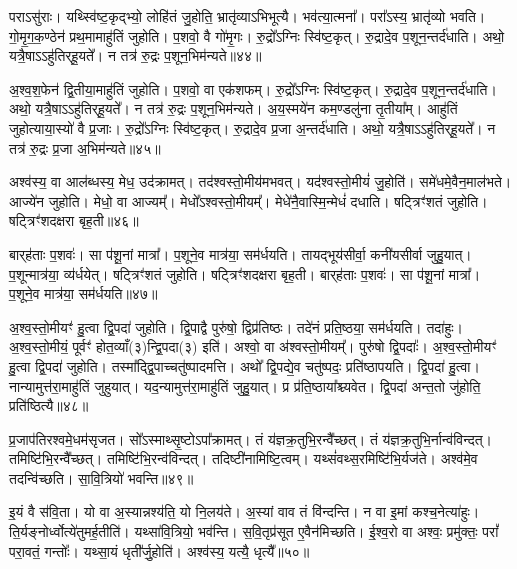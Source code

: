 पराऽसु॑राः।
यथ्स्वि॑ष्ट॒कृद्भ्यो॒ लोहि॑तं जु॒होति॒ भ्रातृ॑व्याऽभिभूत्यै।
भव॑त्या॒त्मना᳚।
परा᳚ऽस्य॒ भ्रातृ॑व्यो भवति।
गो॒मृ॒ग॒क॒ण्ठेन॑ प्रथ॒मामाहु॑तिं जुहोति।
प॒शवो॒ वै गो॑मृ॒गः।
रु॒द्रो᳚\-ऽग्निः स्वि॑ष्ट॒कृत्।
रु॒द्रादे॒व प॒शून॒न्तर्द॑धाति।
अथो॒ यत्रै॒षा\-ऽऽहु॑तिर्‌\mbox{}हू॒यते᳚।
न तत्र॑ रु॒द्रः प॒शून॒भिम॑न्यते॥४४॥\ip

अ॒श्व॒श॒फेन॑ द्वि॒तीया॒माहु॑तिं जुहोति।
प॒शवो॒ वा एक॑शफम्।
रु॒द्रो᳚\-ऽग्निः स्वि॑ष्ट॒कृत्।
रु॒द्रादे॒व प॒शून॒न्तर्द॑धाति।
अथो॒ यत्रै॒षा\-ऽऽहु॑तिर्‌\mbox{}हू॒यते᳚।
न तत्र॑ रु॒द्रः प॒शून॒भिम॑न्यते।
अ॒य॒स्मये॑न कम॒ण्डलु॑ना तृ॒तीया᳚म्।
आहु॑तिं जुहोत्याया॒स्यो॑ वै प्र॒जाः।
रु॒द्रो᳚\-ऽग्निः स्वि॑ष्ट॒कृत्।
रु॒द्रादे॒व प्र॒जा अ॒न्तर्द॑धाति।
अथो॒ यत्रै॒षा\-ऽऽहु॑तिर्‌\mbox{}हू॒यते᳚।
न तत्र॑ रु॒द्रः प्र॒जा अ॒भिम॑न्यते॥४५॥\ip\anuvakamend[द॒धा॒त्यभ॑वन्मन्यते प्र॒जा अ॒न्तर्द॑धाति॒ द्वे च॑ ]

अश्व॑स्य॒ वा आल॑ब्धस्य॒ मेध॒ उद॑क्रामत्।
तद॑श्वस्तो॒मीय॑\-मभवत्।
यद॑श्वस्तो॒मीयं॑ जु॒होति॑।
समे॑धमे॒वैन॒माल॑भते।
आज्ये॑न जुहोति।
मेधो॒ वा आज्यम्᳚।
मेधो᳚\-ऽश्वस्तो॒मीयम्᳚।
मेधे॑नै॒वास्मि॒न्मेधं॑ दधाति।
षट्त्रिꣳ॑शतं जुहोति।
षट्त्रिꣳ॑शदक्षरा बृह॒ती॥४६॥\ip

बार्‌\mbox{}ह॑ताः प॒शवः॑।
सा प॑शू॒नां मात्रा᳚।
प॒शूने॒व मात्र॑या॒ सम॑र्धयति।
तायद्भूय॑सीर्वा॒ कनी॑यसीर्वा जुहु॒यात्।
प॒शून्मात्र॑या॒ व्य॑र्धयेत्।
षट्त्रिꣳ॑शतं जुहोति।
षट्त्रिꣳ॑शदक्षरा बृह॒ती।
बार्‌\mbox{}ह॑ताः प॒शवः॑।
सा प॑शू॒नां मात्रा᳚।
प॒शूने॒व मात्र॑या॒ सम॑र्धयति॥४७॥\ip

अ॒श्व॒स्तो॒मीयꣳ॑ हु॒त्वा द्वि॒पदा॑ जुहोति।
द्वि॒पाद्वै पुरु॑षो॒ द्विप्र॑तिष्ठः।
तदे॑नं प्रति॒ष्ठया॒ सम॑र्धयति।
तदा॑हुः।
अ॒श्व॒स्तो॒मीयं॒ पूर्वꣳ॑ होत॒व्याँ(३)न्द्वि॒पदा(३) इति॑।
अश्वो॒ वा अ॑श्वस्तो॒मीयम्᳚।
पुरु॑षो द्वि॒पदाः᳚।
अ॒श्व॒स्तो॒मीयꣳ॑ हु॒त्वा द्वि॒पदा॑ जुहोति।
तस्मा᳚द्\-द्वि॒पाच्चतु॑ष्पादमत्ति।
अथो᳚ द्वि॒पद्ये॒व चतु॑ष्पदः॒ प्रति॑\-ष्ठापयति।
द्वि॒पदा॑ हु॒त्वा।
नान्यामुत्त॑रा॒माहु॑तिं जुहुयात्।
यद॒न्यामुत्त॑रा॒माहु॑तिं जुहु॒यात्।
प्र प्र॑ति॒ष्ठाया᳚श्च्यवेत।
द्वि॒पदा॑ अन्त॒तो जु॑होति॒ प्रति॑\-ष्ठित्यै॥४८॥\ip{}

प्र॒जा\-प॑तिरश्वमे॒धम॑\-सृजत।
सो᳚ऽस्माथ्सृ॒ष्टो\-ऽपा᳚क्रामत्।
तं य॑ज्ञ\-क्र॒तुभि॒रन्वै᳚च्छत्।
तं य॑ज्ञ\-क्र॒तुभि॒र्नान्व॑विन्दत्।
तमिष्टि॑भि॒रन्वै᳚च्छत्।
तमिष्टि॑भि॒रन्व॑विन्दत्।
तदिष्टी॑नामिष्टि॒\-त्वम्।
यथ्सं॑वथ्स॒रमिष्टि॑\-भि॒र्यज॑ते।
अश्व॑मे॒व तदन्वि॑च्छति।
सा॒वि॒त्रियो॑ भवन्ति॥४९॥\ip

इ॒यं वै स॑वि॒ता।
यो वा अ॒स्यान्नश्य॑ति॒ यो नि॒लय॑ते।
अ॒स्यां वाव तं वि॑न्दन्ति।
न वा इ॒मां कश्च॒नेत्या॑हुः।
ति॒र्यङ्नोर्ध्वोत्ये॑तुमर्ह॒तीति॑।
यथ्सा॑वि॒त्रियो॒ भव॑न्ति।
स॒वि॒तृ\-प्र॑सूत ए॒वैन॑मिच्छति।
ई॒श्व॒रो वा अश्वः॒ प्रमु॑क्तः॒ परां᳚ परा॒वतं॒ गन्तोः᳚।
यथ्सा॒यं धृती᳚र्जु॒होति॑।
अश्व॑स्य॒ यत्यै॒ धृत्यै᳚॥५०॥\ip

